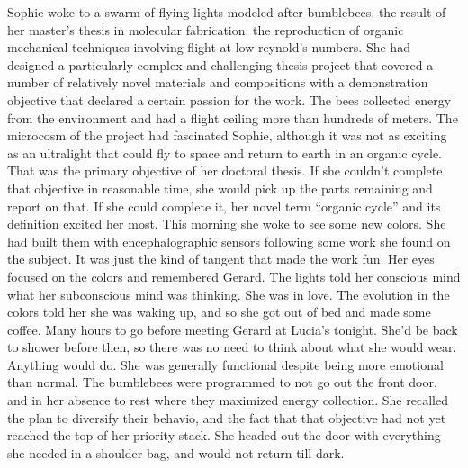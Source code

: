 

Sophie woke to a swarm of flying lights modeled after bumblebees, the
result of her master's thesis in molecular fabrication: the
reproduction of organic mechanical techniques involving flight at low
reynold's numbers.  She had designed a particularly complex and
challenging thesis project that covered a number of relatively novel
materials and compositions with a demonstration objective that
declared a certain passion for the work.  The bees collected energy
from the environment and had a flight ceiling more than hundreds of
meters.  The microcosm of the project had fascinated Sophie, although
it was not as exciting as an ultralight that could fly to space and
return to earth in an organic cycle.  That was the primary objective
of her doctoral thesis.  If she couldn't complete that objective in
reasonable time, she would pick up the parts remaining and report on
that.  If she could complete it, her novel term ``organic cycle'' and
its definition excited her most.  This morning she woke to see some
new colors.  She had built them with encephalographic sensors
following some work she found on the subject.  It was just the kind of
tangent that made the work fun.  Her eyes focused on the colors and
remembered Gerard.  The lights told her conscious mind what her
subconscious mind was thinking.  She was in love.  The evolution in
the colors told her she was waking up, and so she got out of bed and
made some coffee.  Many hours to go before meeting Gerard at Lucia's
tonight.  She'd be back to shower before then, so there was no need to
think about what she would wear.  Anything would do.  She was
generally functional despite being more emotional than normal.  The
bumblebees were programmed to not go out the front door, and in her
absence to rest where they maximized energy collection.  She recalled
the plan to diversify their behavio, and the fact that that objective
had not yet reached the top of her priority stack.  She headed out the
door with everything she needed in a shoulder bag, and would not
return till dark.

\bye
